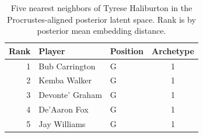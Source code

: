 \begin{table}[htbp]
  \centering\small
  \begin{tabular}{rllc}
    \toprule
    Rank & Player & Position & Archetype \\
    \midrule
    1 & Bub Carrington & G & 1 \\
    2 & Kemba Walker & G & 1 \\
    3 & Devonte' Graham & G & 1 \\
    4 & De'Aaron Fox & G & 1 \\
    5 & Jay Williams & G & 1 \\
    \bottomrule
  \end{tabular}
  \caption{Five nearest neighbors of Tyrese Haliburton in the Procrustes-aligned posterior latent space. Rank is by posterior mean embedding distance.}
  \label{tab:Tyrese_Haliburton_neighbors}
\end{table}

